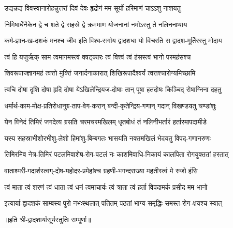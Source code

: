 

\twolineshloka
{उद्यन्नद्य विवस्वानारोहन्नुत्तरां दिवं देवः}
{हृद्रोगं मम सूर्यो हरिमाणं चाऽऽशु नाशयतु}%

\twolineshloka
{निमिषार्धेनैकेन द्वे च शते द्वे सहस्रे द्वे}
{क्रममाण योजनानां नमोऽस्तु ते नलिननाथाय}%

\twolineshloka
{कर्म-ज्ञान-ख-दशकं मनश्च जीव इति विश्व-सर्गाय}
{द्वादशधा यो विचरति स द्वादश-मूर्तिरस्तु मोदाय}%

\twolineshloka
{त्वं हि यजुर्ऋक् साम त्वमागमस्त्वं वषट्कारः}
{त्वं विश्वं त्वं हंसस्त्वं भानो परमहंसश्च}%

\twolineshloka
{शिवरूपाज्ज्ञानमहं त्वत्तो मुक्तिं जनार्दनाकारात्}
{शिखिरूपादैश्वर्यं त्वत्तश्चारोग्यमिच्छामि}%

\twolineshloka
{त्वचि दोषा दृशि दोषा हृदि दोषा येऽखिलेन्द्रियज-दोषाः}
{तान् पूषा हतदोषः किञ्चिद् रोषाग्निना दहतु}%

\twolineshloka
{धर्मार्थ-काम-मोक्ष-प्रतिरोधानुग्र-ताप-वेग-करान्}
{बन्दी-कृतेन्द्रिय-गणान् गदान् विखण्डयतु चण्डांशुः}%

\twolineshloka
{येन विनेदं तिमिरं जगदेत्य ग्रसति चरमचरमखिलम्}
{धृतबोधं तं नलिनीभर्तारं हर्तारमापदामीडे}%

\twolineshloka
{यस्य सहस्राभीशोरभीशु-लेशो हिमांशु-बिम्बगतः}
{भासयति नक्तमखिलं भेदयतु विपद्-गणानरुणः}%

\twolineshloka
{तिमिरमिव नेत्र-तिमिरं पटलमिवाशेष-रोग-पटलं नः}
{काशमिवाधि-निकायं कालपिता रोगयुक्ततां हरतात्}%

\twolineshloka
{वाताश्मरी-गदार्शस्त्वग्-दोष-महोदर-प्रमेहांश्च}
{ग्रहणी-भगन्दराख्या महतीस्त्वं मे रुजो हंसि}%

\twolineshloka
{त्वं माता त्वं शरणं त्वं धाता त्वं धनं त्वमाचार्यः}
{त्वं त्राता त्वं हर्ता विपदामर्क प्रसीद मम भानो}%

\twolineshloka
{इत्यार्या-द्वादशकं साम्बस्य पुरो नभःस्थलात् पतितम्}
{पठतां भाग्य-समृद्धिः समस्त-रोग-क्षयश्च स्यात्}%


॥इति श्री-द्वादशार्यासूर्यस्तुतिः सम्पूर्णा॥